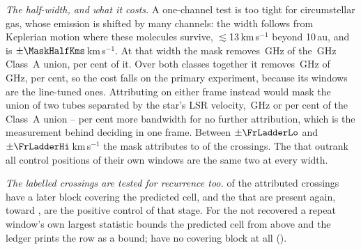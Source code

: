 \emph{The half-width, and what it costs.} A one-channel test is too tight for
circumstellar gas, whose emission is shifted by many channels: the width
follows from Keplerian motion where these molecules survive,
$\lesssim$13\,km\,s$^{-1}$ beyond 10\,au, and is
$\pm\MaskHalfKms$\,km\,s$^{-1}$. At that width the mask removes
\MkMaskAGHz\,GHz of the \CvUnionA\,GHz Class~A union, \MkMaskAPct{} per cent
of it. Over both classes together it removes \FrMaskLostGHz\,GHz of
\FrMaskUnionGHz\,GHz, \FrMaskPct{} per cent, so the cost falls on the primary
experiment, because its windows are the line-tuned ones.
Attributing on either frame instead would mask the union of two tubes
separated by the star's LSR velocity, \LsMaskTwoGHz\,GHz or
\LsMaskTwoPct{} per cent of the Class~A union -- \LsMaskAddPct{} per cent
more bandwidth for no further attribution, which is the measurement behind
deciding in one frame. Between $\pm\FrLadderLo$ and
$\pm\FrLadderHi$\,km\,s$^{-1}$ the mask attributes \FrAttrWTwenty{} to
\FrAttrWHundred{} of the crossings. The \FrNRankPass{} that outrank all
\NCtrl{} control positions of their own windows are the same two at every
width.

\emph{The labelled crossings are tested for recurrence too.} \MkAttrTested{}
of the \MkAttr{} attributed crossings have a later block covering the
predicted cell, and the \MkAttrRecur{} that are present again, toward
\MkAttrRecurStars, are the positive control of that stage. For the
\MkAttrExcl{} not recovered a repeat window's own largest statistic bounds
the predicted cell from above and the ledger prints the row as a
bound; \MkAttrUntest{} have no covering block at all
(\MkAttrUntestNames).
